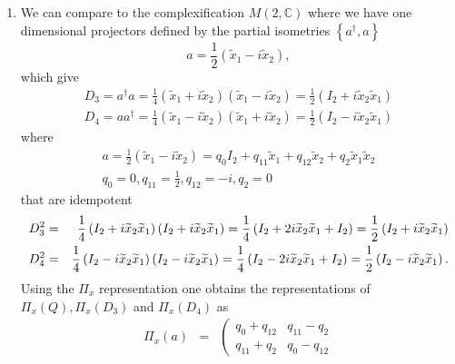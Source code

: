 \documentclass[aps,preprint]{revtex4}
\begin{document}
\begin{enumerate}
\item We can compare to the complexification $M\left( 2,\mathbb{C}\right) $
where we have one dimensional projectors defined by the partial isometries $%
\left\{ a^{\dagger },a\right\} $ 
\begin{equation}
a=\frac{1}{2}\left( \widetilde{x}_{1}-i\widetilde{x}_{2}\right) ,
\end{equation}%
which give 
\begin{gather}
D_{3}=a^{\dagger }a=\frac{1}{4}\left( \widetilde{x}_{1}+i\widetilde{x}%
_{2}\right) \left( \widetilde{x}_{1}-i\widetilde{x}_{2}\right) =\frac{1}{2}%
\left( I_{2}+i\widetilde{x}_{2}\widetilde{x}_{1}\right) \\
D_{4}=aa^{\dagger }=\frac{1}{4}\left( \widetilde{x}_{1}-i\widetilde{x}%
_{2}\right) \left( \widetilde{x}_{1}+i\widetilde{x}_{2}\right) =\frac{1}{2}%
\left( I_{2}-i\widetilde{x}_{2}\widetilde{x}_{1}\right)
\end{gather}%
where 
\begin{gather}
a=\frac{1}{2}\left( \widetilde{x}_{1}-i\widetilde{x}_{2}\right)
=q_{0}I_{2}+q_{11}\widetilde{x}_{1}+q_{12}\widetilde{x}_{2}+q_{2}\widetilde{x%
}_{1}\widetilde{x}_{2} \\
q_{0}=0,q_{11}=\frac{1}{2},q_{12}=-i,q_{2}=0
\end{gather}%
that are idempotent 
\begin{eqnarray}
D_{3}^{2} &=&\frac{1}{4}\left( I_{2}+i\widetilde{x}_{2}\widetilde{x}%
_{1}\right) \left( I_{2}+i\widetilde{x}_{2}\widetilde{x}_{1}\right) =\frac{1%
}{4}\left( I_{2}+2i\widetilde{x}_{2}\widetilde{x}_{1}+I_{2}\right) =\frac{1}{%
2}\left( I_{2}+i\widetilde{x}_{2}\widetilde{x}_{1}\right) \\
D_{4}^{2} &=&\frac{1}{4}\left( I_{2}-i\widetilde{x}_{2}\widetilde{x}%
_{1}\right) \left( I_{2}-i\widetilde{x}_{2}\widetilde{x}_{1}\right) =\frac{1%
}{4}\left( I_{2}-2i\widetilde{x}_{2}\widetilde{x}_{1}+I_{2}\right) =\frac{1}{%
2}\left( I_{2}-i\widetilde{x}_{2}\widetilde{x}_{1}\right) .
\end{eqnarray}%
Using the $\Pi _{x}$ representation one obtains the representations of $%
\mathcal{\Pi }_{x}\left( Q\right) ,\mathcal{\Pi }_{x}\left( D_{3}\right) $
and $\mathcal{\Pi }_{x}\left( D_{4}\right) $ as 
\begin{eqnarray*}
\mathcal{\Pi }_{x}\left( a\right) &=&\left( 
\begin{array}{cc}
q_{0}+q_{12} & q_{11}-q_{2} \\ 
q_{11}+q_{2} & q_{0}-q_{12}%
\end{array}%

\end{eqnarray*}
\end{enumerate}
\end{document}
